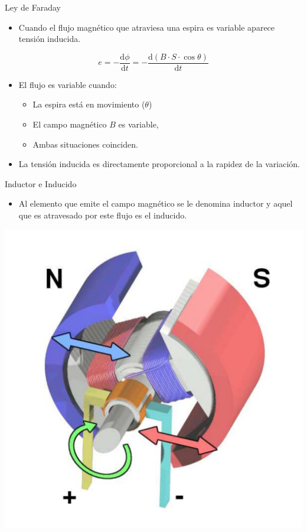 \documentclass[xcolor={usenames,svgnames,dvipsnames}]{beamer}
\begin{document}
\begin{frame}[label={sec:orgc9a4662}]{Ley de Faraday}
\begin{itemize}
\item Cuando el \alert{flujo magnético} que atraviesa una espira es \alert{variable}
aparece \alert{tensión inducida}.
\end{itemize}

\[
e=-\frac{\mathrm{d}\phi}{\mathrm{d}t} = -\frac{\mathrm{d}(B \cdot S\cdot \cos \theta)}{\mathrm{d}t} 
\]

\begin{itemize}
\item El flujo es variable cuando:

\begin{itemize}
\item La \alert{espira está en movimiento} (\(\theta\))

\item El \alert{campo magnético \(B\) es variable},

\item Ambas situaciones coinciden.
\end{itemize}

\item La tensión inducida es directamente proporcional a la rapidez de la
variación.
\end{itemize}
\end{frame}


\begin{frame}[label={sec:org5366ea5}]{Inductor e Inducido}
\begin{itemize}
\item Al elemento que emite el campo magnético se le denomina \alert{inductor} y
aquel que es atravesado por este flujo es el \alert{inducido}.
\end{itemize}
\begin{center}
\includegraphics[height=0.7\textheight]{../figs/Electric_motor_cycle_3.pdf}
\end{center}
\end{frame}
\end{document}
